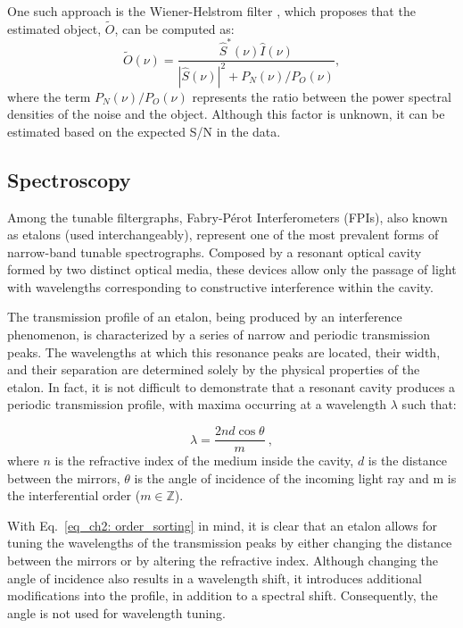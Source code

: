 One such approach is the Wiener-Helstrom filter \citep{wiener-helstorm}, which proposes that the estimated object, $\tilde{O}$, can be computed as:
\begin{equation}
  \tilde{O}(\nu) =  \frac{\hat{S}^{*}(\nu) \hat{I}(\nu)}{| \hat{S}(\nu)| ^2 + P_N (\nu) / P_O (\nu)},
  \label{eq_imaging: Wiener-Helstorm}
\end{equation} 
where the term $P_N(\nu) / P_O(\nu)$ represents the ratio between the power spectral densities of the noise and the object. Although this factor is unknown, it can be estimated based on the expected S/N in the data.

\subsection{Spectroscopy}

Among the tunable filtergraphs, Fabry-Pérot Interferometers (FPIs), also known as etalons (used interchangeably), represent one of the most prevalent forms of narrow-band tunable spectrographs. Composed by a resonant optical cavity formed by two distinct optical media, these devices allow only the passage of light with wavelengths corresponding to constructive interference within the cavity. 

The transmission profile of an etalon, being produced by an interference phenomenon, is characterized by a series of narrow and periodic transmission peaks. The wavelengths at which this resonance peaks are located, their width, and their separation are determined solely by the physical properties of the etalon. In fact, it is not difficult to demonstrate \citep{franI} that a resonant cavity produces a periodic transmission profile, with maxima occurring at a wavelength $\lambda$ such that:

\begin{equation}
\lambda = \frac{2nd\cos \theta}{m}\ ,
\label{eq_ch2: order_sorting}
\end{equation}
where $n$ is the refractive index of the medium inside the cavity, $d$ is the distance between the mirrors, $\theta$ is the angle of incidence of the incoming light ray and m is the interferential order ($m \in \mathbb{Z} $). 

With Eq.~\eqref{eq_ch2: order_sorting} in mind, it is clear that an etalon allows for tuning the wavelengths of the transmission peaks by either changing the distance between the mirrors or by altering the refractive index. Although changing the angle of incidence also results in a wavelength shift, it introduces additional modifications into the profile, in addition to a spectral shift. Consequently, the angle is not used for wavelength tuning.

